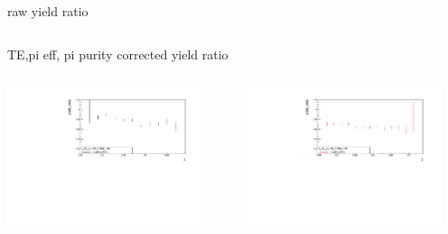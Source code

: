 \begin{frame}{raw yield ratio}
\begin{columns}
\begin{column}[T]{0.5\textwidth}
\end{column}
\begin{column}[T]{0.5\textwidth}
\end{column}
\end{columns}
\end{frame}
\begin{frame}{TE,pi eff, pi purity corrected yield ratio}
\begin{columns}
\begin{column}[T]{0.5\textwidth}
\includegraphics[width = 0.9\textwidth]{results/yield/statistics_corr/x_Q2_z_0.55_5.500_0.45_ratio.pdf}
\end{column}
\begin{column}[T]{0.5\textwidth}
\includegraphics[width = 0.9\textwidth]{results/yield/statistics_corr/x_Q2_z_0.55_5.500_0.55_ratio.pdf}
\end{column}
\end{columns}
\begin{columns}

\end{columns}
\end{frame}
